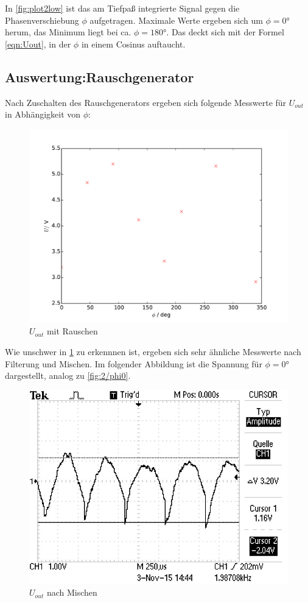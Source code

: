 In \ref{fig:plot2low} ist das am Tiefpaß integrierte Signal gegen die
Phasenverschiebung $\phi$ aufgetragen. Maximale Werte ergeben sich um $\phi = 0°$
herum, das Minimum liegt bei ca. $\phi = 180°$. Das deckt sich mit der Formel
\eqref{eqn:Uout}, in der $\phi$ in einem Cosinus auftaucht.

\subsection{Auswertung:Rauschgenerator}
Nach Zuschalten des Rauschgenerators ergeben sich folgende Messwerte für
$U_{out}$ in Abhängigkeit von $\phi$:
\begin{figure}
  \centering
  \includegraphics{plot3u.pdf}
  \caption{$U_{out}$ mit Rauschen}
  \label{fig:plot3u}
\end{figure}

Wie unschwer in \ref{fig:plot3u} zu erkennnen ist, ergeben sich sehr ähnliche
Messwerte nach Filterung und Mischen. Im folgender Abbildung ist die
Spannung für $\phi=0°$ dargestellt, analog zu \ref{fig:2/phi0}.

\begin{figure}
  \centering
  \includegraphics{graphics/ALL0039/F0039TEK.jpg}
  \caption{$U_{out}$ nach Mischen}
  \label{fig:3/phi0}
\end{figure}

